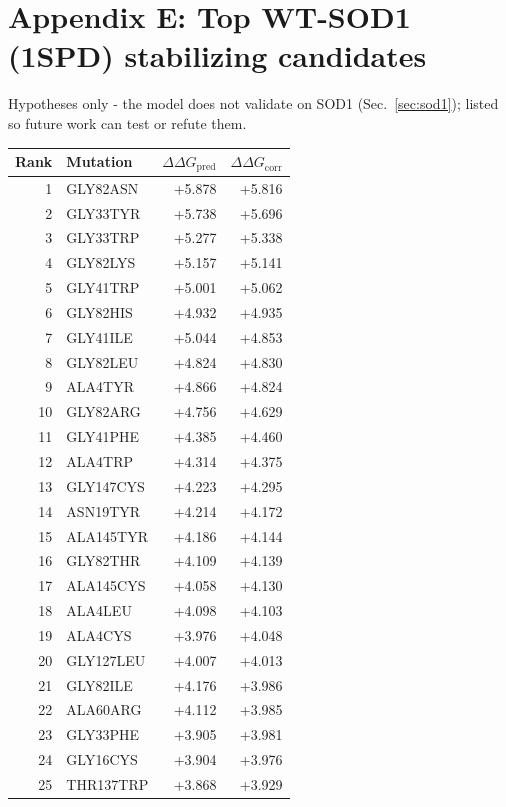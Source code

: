 \section*{Appendix E: Top WT-SOD1 (1SPD) stabilizing candidates}
Hypotheses only - the model does not validate on SOD1
(Sec.~\ref{sec:sod1}); listed so future work can test or refute them.
\begin{longtable}{r l r r}
\hline
Rank & Mutation & $\Delta\Delta G_{\mathrm{pred}}$ & $\Delta\Delta G_{\mathrm{corr}}$ \\ \hline
\endhead
1 & GLY82ASN & +5.878 & +5.816 \\
2 & GLY33TYR & +5.738 & +5.696 \\
3 & GLY33TRP & +5.277 & +5.338 \\
4 & GLY82LYS & +5.157 & +5.141 \\
5 & GLY41TRP & +5.001 & +5.062 \\
6 & GLY82HIS & +4.932 & +4.935 \\
7 & GLY41ILE & +5.044 & +4.853 \\
8 & GLY82LEU & +4.824 & +4.830 \\
9 & ALA4TYR & +4.866 & +4.824 \\
10 & GLY82ARG & +4.756 & +4.629 \\
11 & GLY41PHE & +4.385 & +4.460 \\
12 & ALA4TRP & +4.314 & +4.375 \\
13 & GLY147CYS & +4.223 & +4.295 \\
14 & ASN19TYR & +4.214 & +4.172 \\
15 & ALA145TYR & +4.186 & +4.144 \\
16 & GLY82THR & +4.109 & +4.139 \\
17 & ALA145CYS & +4.058 & +4.130 \\
18 & ALA4LEU & +4.098 & +4.103 \\
19 & ALA4CYS & +3.976 & +4.048 \\
20 & GLY127LEU & +4.007 & +4.013 \\
21 & GLY82ILE & +4.176 & +3.986 \\
22 & ALA60ARG & +4.112 & +3.985 \\
23 & GLY33PHE & +3.905 & +3.981 \\
24 & GLY16CYS & +3.904 & +3.976 \\
25 & THR137TRP & +3.868 & +3.929 \\
\hline
\end{longtable}
